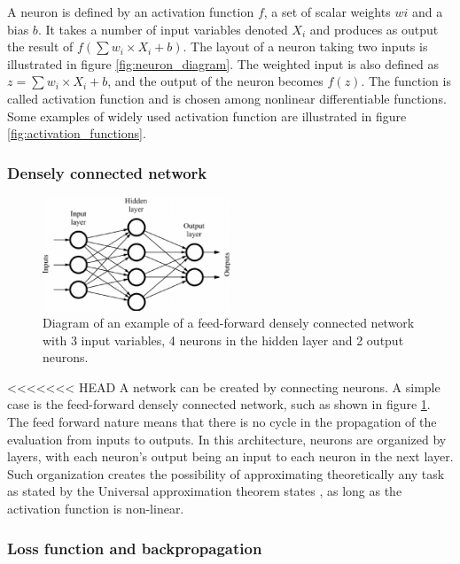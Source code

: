 A neuron is defined by an activation function $f$, a set of scalar weights $wi$ and a bias $b$. It takes a number of input variables denoted $X_i$ and produces as output the result of $f(\sum w_i\times X_i + b)$. The layout of a neuron taking two inputs is illustrated in figure \ref{fig:neuron_diagram}. The weighted input is also defined as $z = \sum w_i\times X_i + b$, and the output of the neuron becomes $f(z)$. The function is called activation function and is chosen among nonlinear differentiable functions. Some examples of widely used activation function are illustrated in figure \ref{fig:activation_functions}.

\subsubsection{Densely connected network}


\begin{figure}
    \centering
    \includegraphics[width=0.5\textwidth]{Images/dense_network.png}
    \caption{Diagram of an example of a feed-forward densely connected network with 3 input variables, 4 neurons in the hidden layer and 2 output neurons.}
    \label{fig:dense_network}
\end{figure}

<<<<<<< HEAD
A network can be created by connecting neurons. A simple case is the feed-forward densely connected network, such as shown in figure \ref{fig:dense_network}. The feed forward nature means that there is no cycle in the propagation of the evaluation from inputs to outputs. In this architecture, neurons are organized by layers, with each neuron's output being an input to each neuron in the next layer. Such organization creates the possibility of approximating theoretically any task as stated by the Universal approximation theorem states \cite{Cybenko1989}, as long as the activation function is non-linear.

\subsubsection{Loss function and backpropagation}

